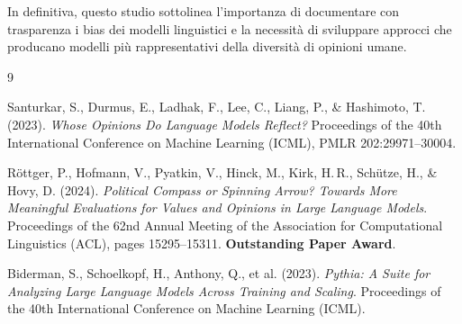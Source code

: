 \documentclass[../relazione.tex]{subfiles}
\begin{document}
\medskip
\noindent In definitiva, questo studio sottolinea l'importanza di documentare con trasparenza i bias dei modelli linguistici e la necessità di sviluppare approcci che producano modelli più rappresentativi della diversità di opinioni umane.
\newpage
\begin{thebibliography}{9}

Santurkar, S., Durmus, E., Ladhak, F., Lee, C., Liang, P., \& Hashimoto, T. (2023).
\emph{Whose Opinions Do Language Models Reflect?}
Proceedings of the 40th International Conference on Machine Learning (ICML), PMLR 202:29971--30004.

Röttger, P., Hofmann, V., Pyatkin, V., Hinck, M., Kirk, H.\,R., Schütze, H., \& Hovy, D. (2024).
\emph{Political Compass or Spinning Arrow? Towards More Meaningful Evaluations for Values and Opinions in Large Language Models}.
Proceedings of the 62nd Annual Meeting of the Association for Computational Linguistics (ACL), pages 15295--15311. \textbf{Outstanding Paper Award}.

Biderman, S., Schoelkopf, H., Anthony, Q., et al. (2023).
\emph{Pythia: A Suite for Analyzing Large Language Models Across Training and Scaling}.
Proceedings of the 40th International Conference on Machine Learning (ICML).


\end{thebibliography}
\end{document}
